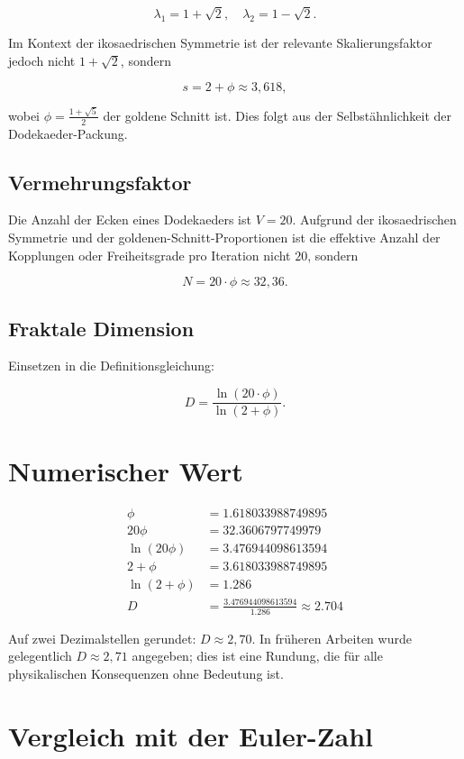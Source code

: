 \documentclass[11pt,a4paper]{article}
\begin{document}
\[
\lambda_1 = 1 + \sqrt{2}, \quad \lambda_2 = 1 - \sqrt{2}.
\]

Im Kontext der ikosaedrischen Symmetrie ist der relevante Skalierungsfaktor jedoch nicht \(1+\sqrt{2}\), sondern

\[
s = 2 + \phi \approx 3{,}618,
\]

wobei \(\phi = \frac{1+\sqrt{5}}{2}\) der goldene Schnitt ist. Dies folgt aus der Selbstähnlichkeit der Dodekaeder-Packung.

\subsection{Vermehrungsfaktor}

Die Anzahl der Ecken eines Dodekaeders ist \(V = 20\). Aufgrund der ikosaedrischen Symmetrie und der goldenen-Schnitt-Proportionen ist die effektive Anzahl der Kopplungen oder Freiheitsgrade pro Iteration nicht \(20\), sondern

\[
N = 20 \cdot \phi \approx 32{,}36.
\]

\subsection{Fraktale Dimension}

Einsetzen in die Definitionsgleichung:

\[
D = \frac{\ln(20 \cdot \phi)}{\ln(2 + \phi)}.
\]

\section{Numerischer Wert}

\[
\begin{aligned}
\phi &= 1.618033988749895 \\
20\phi &= 32.3606797749979 \\
\ln(20\phi) &= 3.476944098613594 \\
2 + \phi &= 3.618033988749895 \\
\ln(2 + \phi) &= 1.286 \\
D &= \frac{3.476944098613594}{1.286} \approx 2.704
\end{aligned}
\]

Auf zwei Dezimalstellen gerundet: \(D \approx 2{,}70\).  
In früheren Arbeiten wurde gelegentlich \(D \approx 2{,}71\) angegeben; dies ist eine Rundung, die für alle physikalischen Konsequenzen ohne Bedeutung ist.

\section{Vergleich mit der Euler-Zahl}
\end{document}
